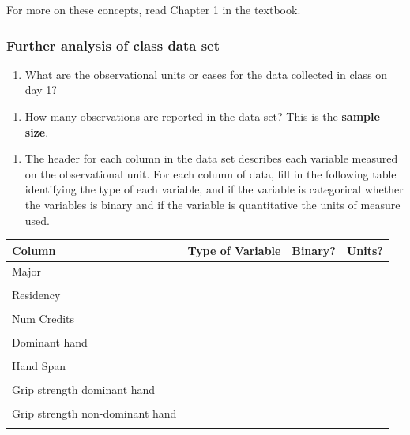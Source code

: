 \documentclass[
]{report}
\providecommand{\tightlist}{%
  \setlength{\itemsep}{0pt}\setlength{\parskip}{0pt}}
\begin{document}
For more on these concepts, read Chapter 1 in the textbook.

\subsubsection*{Further analysis of class data set}\label{further-analysis-of-class-data-set}

\begin{enumerate}
\def\labelenumi{\arabic{enumi}.}
\tightlist
\item
  What are the observational units or cases for the data collected in class on day 1?
\end{enumerate}

\vspace{0.3in}

\begin{enumerate}
\def\labelenumi{\arabic{enumi}.}
\setcounter{enumi}{1}
\tightlist
\item
  How many observations are reported in the data set? This is the \textbf{sample size}.
\end{enumerate}

\vspace{0.3in}

\begin{enumerate}
\def\labelenumi{\arabic{enumi}.}
\setcounter{enumi}{2}
\tightlist
\item
  The header for each column in the data set describes each variable measured on the observational unit. For each column of data, fill in the following table identifying the type of each variable, and if the variable is categorical whether the variables is binary and if the variable is quantitative the units of measure used.
\end{enumerate}

\begin{center}
\begin{tabular}{|l|p{1.5in}|p{0.5in}|p{0.5in}|} \hline
Column & Type of Variable & Binary? & Units? \\ \hline
Major & & &\\
& & & \\ \hline
Residency & & & \\
& & & \\ \hline
Num Credits & & & \\
& & & \\ \hline
Dominant hand & & & \\
& & & \\ \hline
Hand Span & & & \\
& & & \\ \hline
Grip strength dominant hand & & & \\
& & & \\ \hline
Grip strength non-dominant hand & & & \\
& & & \\ \hline
\end{tabular}
\end{center}
\end{document}
